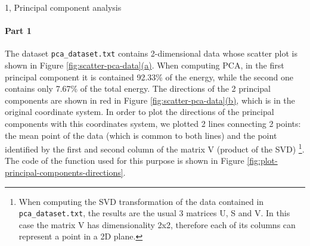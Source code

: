 \documentclass[10pt,a4paper]{article}
\begin{document}
\begin{task}{1, Principal component analysis}
\paragraph{Part 1}
The dataset \texttt{pca\_dataset.txt} contains 2-dimensional data whose scatter plot is shown in Figure \hyperref[fig:scatter-pca-data]{\ref{fig:scatter-pca-data}(a)}.
When computing PCA, in the first principal component it is contained 92.33\% of the energy, while the second one contains only 7.67\% of the total energy.
The directions of the 2 principal components are shown in red in Figure \hyperref[fig:scatter-pca-data]{\ref{fig:scatter-pca-data}(b)}, which is in the original coordinate system.
In order to plot the directions of the principal components with this coordinates system, we plotted 2 lines connecting 2 points: the mean point of the data (which is common to both lines) and the point identified by the first and second column of the matrix V (product of the SVD)
\footnote{When computing the SVD transformation of the data contained in \texttt{pca\_dataset.txt}, the results are the usual 3 matrices U, S and V.
In this case the matrix V has dimensionality 2x2, therefore each of its columns can represent a point in a 2D plane.}.
The code of the function used for this purpose is shown in Figure \ref{fig:plot-principal-components-directions}.


\end{task}
\end{document}
